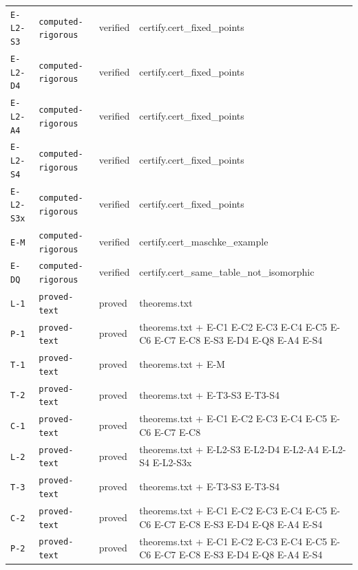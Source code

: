 \begin{longtable}{p{1.6cm}p{3.0cm}p{1.3cm}p{6.8cm}}
\texttt{E-L2-S3} & {\footnotesize\texttt{computed-rigorous}} & verified & \footnotesize certify.cert\_fixed\_points \\
\texttt{E-L2-D4} & {\footnotesize\texttt{computed-rigorous}} & verified & \footnotesize certify.cert\_fixed\_points \\
\texttt{E-L2-A4} & {\footnotesize\texttt{computed-rigorous}} & verified & \footnotesize certify.cert\_fixed\_points \\
\texttt{E-L2-S4} & {\footnotesize\texttt{computed-rigorous}} & verified & \footnotesize certify.cert\_fixed\_points \\
\texttt{E-L2-S3x} & {\footnotesize\texttt{computed-rigorous}} & verified & \footnotesize certify.cert\_fixed\_points \\
\texttt{E-M} & {\footnotesize\texttt{computed-rigorous}} & verified & \footnotesize certify.cert\_maschke\_example \\
\texttt{E-DQ} & {\footnotesize\texttt{computed-rigorous}} & verified & \footnotesize certify.cert\_same\_table\_not\_isomorphic \\
\texttt{L-1} & {\footnotesize\texttt{proved-text}} & proved & \footnotesize theorems.txt \\
\texttt{P-1} & {\footnotesize\texttt{proved-text}} & proved & \footnotesize theorems.txt + E-C1 E-C2 E-C3 E-C4 E-C5 E-C6 E-C7 E-C8 E-S3 E-D4 E-Q8 E-A4 E-S4 \\
\texttt{T-1} & {\footnotesize\texttt{proved-text}} & proved & \footnotesize theorems.txt + E-M \\
\texttt{T-2} & {\footnotesize\texttt{proved-text}} & proved & \footnotesize theorems.txt + E-T3-S3 E-T3-S4 \\
\texttt{C-1} & {\footnotesize\texttt{proved-text}} & proved & \footnotesize theorems.txt + E-C1 E-C2 E-C3 E-C4 E-C5 E-C6 E-C7 E-C8 \\
\texttt{L-2} & {\footnotesize\texttt{proved-text}} & proved & \footnotesize theorems.txt + E-L2-S3 E-L2-D4 E-L2-A4 E-L2-S4 E-L2-S3x \\
\texttt{T-3} & {\footnotesize\texttt{proved-text}} & proved & \footnotesize theorems.txt + E-T3-S3 E-T3-S4 \\
\texttt{C-2} & {\footnotesize\texttt{proved-text}} & proved & \footnotesize theorems.txt + E-C1 E-C2 E-C3 E-C4 E-C5 E-C6 E-C7 E-C8 E-S3 E-D4 E-Q8 E-A4 E-S4 \\
\texttt{P-2} & {\footnotesize\texttt{proved-text}} & proved & \footnotesize theorems.txt + E-C1 E-C2 E-C3 E-C4 E-C5 E-C6 E-C7 E-C8 E-S3 E-D4 E-Q8 E-A4 E-S4 \\

\end{longtable}
